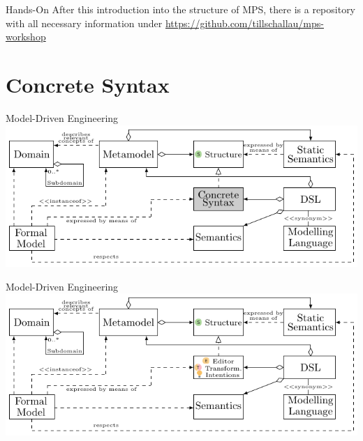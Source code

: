 	\begin{frame}{Hands-On}
		After this introduction into the structure of MPS, there is a repository with all necessary information under \url{https://github.com/tillschallau/mps-workshop}
	\end{frame}

	\section{Concrete Syntax}
	
	\begin{frame}{Model-Driven Engineering}
		\includegraphics[width=\textwidth]{tikz/mdsd_concept_3.pdf}
	\end{frame}

	\begin{frame}[noframenumbering]{Model-Driven Engineering}
		\includegraphics[width=\textwidth]{tikz/mdsd_concept_4.pdf}
	\end{frame}

